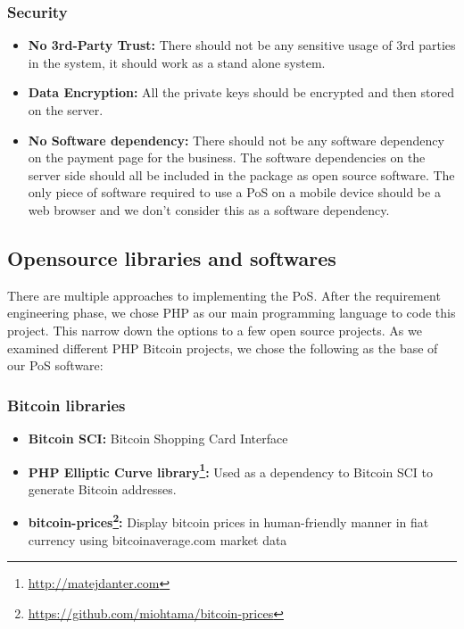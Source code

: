 \subsubsection{Security} 
\begin{itemize}

\item \textbf{No 3rd-Party Trust: } There should not be any sensitive usage of 3rd parties in the system, it should work as a stand alone system.

\item \textbf{Data Encryption: } All the private keys should be encrypted and then stored on the server. 

\item \textbf{No Software dependency: } There should not be any software dependency on the payment page for the business. The software dependencies on the server side should all be included in the package as open source software. The only piece of software required to use a PoS on a mobile device should be a web browser and we don't consider this as a software dependency.

\end{itemize}



\subsection{Opensource libraries and softwares}
There are multiple approaches to implementing the PoS. After the requirement engineering phase, we chose PHP as our main programming language to code this project. This narrow down the options to a few open source projects.
As we examined different PHP Bitcoin projects, we chose the following as the base of our PoS software:

\subsubsection{Bitcoin libraries}
\begin{itemize}

\item \textbf{Bitcoin SCI: }Bitcoin Shopping Card Interface
\item \textbf{PHP Elliptic Curve library\footnote{\url{http://matejdanter.com}}: } Used as a dependency to Bitcoin SCI to generate Bitcoin addresses.
\item \textbf{bitcoin-prices\footnote{\url{https://github.com/miohtama/bitcoin-prices}}: } Display bitcoin prices in human-friendly manner in fiat currency using bitcoinaverage.com market data

\end{itemize}

